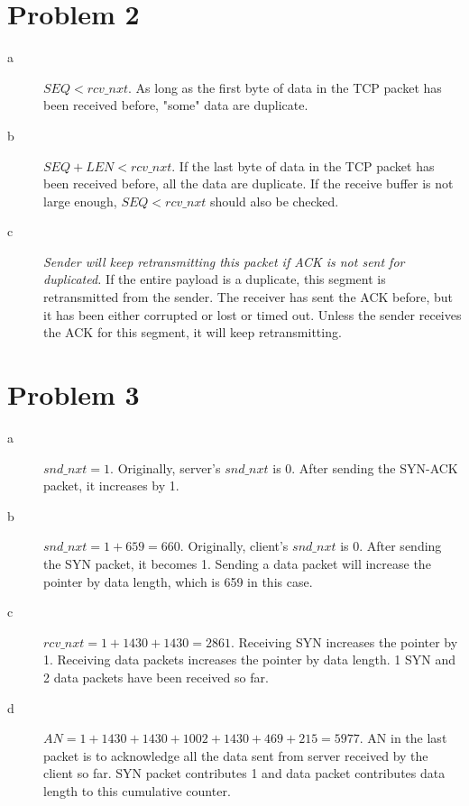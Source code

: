 \documentclass[11pt]{article}
\begin{document}
\section{Problem 2}
\begin{description}
	\item[a] $SEQ<rcv\_nxt$. As long as the first byte of data in the TCP packet has been received before, "some" data are duplicate.
	\item[b] $SEQ+LEN<rcv\_nxt$. If the last byte of data in the TCP packet has been received before, all the data are duplicate. If the receive buffer is not large enough, $SEQ<rcv\_nxt$ should also be checked.
	\item[c] \emph{Sender will keep retransmitting this packet if ACK is not sent for duplicated.} If the entire payload is a duplicate, this segment is retransmitted from the sender. The receiver has sent the ACK before, but it has been either corrupted or lost or timed out. Unless the sender receives the ACK for this segment, it will keep retransmitting.
\end{description}

\section{Problem 3}
\begin{description}
	\item[a] $snd\_nxt=1$. Originally, server's $snd\_nxt$ is 0. After sending the SYN-ACK packet, it increases by 1.
	\item[b] $snd\_nxt=1+659=660$. Originally, client's $snd\_nxt$ is 0. After sending the SYN packet, it becomes 1. Sending a data packet will increase the pointer by data length, which is 659 in this case.
	\item[c] $rcv\_nxt=1+1430+1430=2861$. Receiving SYN increases the pointer by 1. Receiving data packets increases the pointer by data length. 1 SYN and 2 data packets have been received so far.
	\item[d] $AN=1+1430+1430+1002+1430+469+215=5977$. AN in the last packet is to acknowledge all the data sent from server received by the client so far. SYN packet contributes 1 and data packet contributes data length to this cumulative counter.
\end{description}
\end{document}
